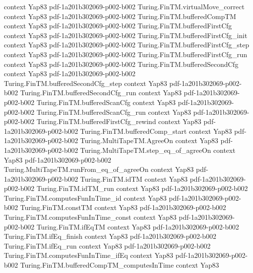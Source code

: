 \begin{theorem}
  {context}
  {Yap83}
  {pdf-1a201b302069-p002-b002}
\proofstep
  {Turing.FinTM.virtualMove_correct}
  {context}
  {Yap83}
  {pdf-1a201b302069-p002-b002}
\proofstep
  {Turing.FinTM.bufferedCompTM}
  {context}
  {Yap83}
  {pdf-1a201b302069-p002-b002}
\proofstep
  {Turing.FinTM.bufferedFirstCfg}
  {context}
  {Yap83}
  {pdf-1a201b302069-p002-b002}
\proofstep
  {Turing.FinTM.bufferedFirstCfg_init}
  {context}
  {Yap83}
  {pdf-1a201b302069-p002-b002}
\proofstep
  {Turing.FinTM.bufferedFirstCfg_step}
  {context}
  {Yap83}
  {pdf-1a201b302069-p002-b002}
\proofstep
  {Turing.FinTM.bufferedFirstCfg_run}
  {context}
  {Yap83}
  {pdf-1a201b302069-p002-b002}
\proofstep
  {Turing.FinTM.bufferedSecondCfg}
  {context}
  {Yap83}
  {pdf-1a201b302069-p002-b002}
\proofstep
  {Turing.FinTM.bufferedSecondCfg_step}
  {context}
  {Yap83}
  {pdf-1a201b302069-p002-b002}
\proofstep
  {Turing.FinTM.bufferedSecondCfg_run}
  {context}
  {Yap83}
  {pdf-1a201b302069-p002-b002}
\proofstep
  {Turing.FinTM.bufferedScanCfg}
  {context}
  {Yap83}
  {pdf-1a201b302069-p002-b002}
\proofstep
  {Turing.FinTM.bufferedScanCfg_run}
  {context}
  {Yap83}
  {pdf-1a201b302069-p002-b002}
\proofstep
  {Turing.FinTM.bufferedFirstCfg_rewind}
  {context}
  {Yap83}
  {pdf-1a201b302069-p002-b002}
\proofstep
  {Turing.FinTM.bufferedComp_start}
  {context}
  {Yap83}
  {pdf-1a201b302069-p002-b002}
\proofstep
  {Turing.MultiTapeTM.AgreeOn}
  {context}
  {Yap83}
  {pdf-1a201b302069-p002-b002}
\proofstep
  {Turing.MultiTapeTM.step_eq_of_agreeOn}
  {context}
  {Yap83}
  {pdf-1a201b302069-p002-b002}
\proofstep
  {Turing.MultiTapeTM.runFrom_eq_of_agreeOn}
  {context}
  {Yap83}
  {pdf-1a201b302069-p002-b002}
\proofstep
  {Turing.FinTM.idTM}
  {context}
  {Yap83}
  {pdf-1a201b302069-p002-b002}
\proofstep
  {Turing.FinTM.idTM_run}
  {context}
  {Yap83}
  {pdf-1a201b302069-p002-b002}
\proofstep
  {Turing.FinTM.computesFunInTime_id}
  {context}
  {Yap83}
  {pdf-1a201b302069-p002-b002}
\proofstep
  {Turing.FinTM.constTM}
  {context}
  {Yap83}
  {pdf-1a201b302069-p002-b002}
\proofstep
  {Turing.FinTM.computesFunInTime_const}
  {context}
  {Yap83}
  {pdf-1a201b302069-p002-b002}
\proofstep
  {Turing.FinTM.ifEqTM}
  {context}
  {Yap83}
  {pdf-1a201b302069-p002-b002}
\proofstep
  {Turing.FinTM.ifEq_finish}
  {context}
  {Yap83}
  {pdf-1a201b302069-p002-b002}
\proofstep
  {Turing.FinTM.ifEq_run}
  {context}
  {Yap83}
  {pdf-1a201b302069-p002-b002}
\proofstep
  {Turing.FinTM.computesFunInTime_ifEq}
  {context}
  {Yap83}
  {pdf-1a201b302069-p002-b002}
\proofstep
  {Turing.FinTM.bufferedCompTM_computesInTime}
  {context}
  {Yap83}

\end{theorem}
